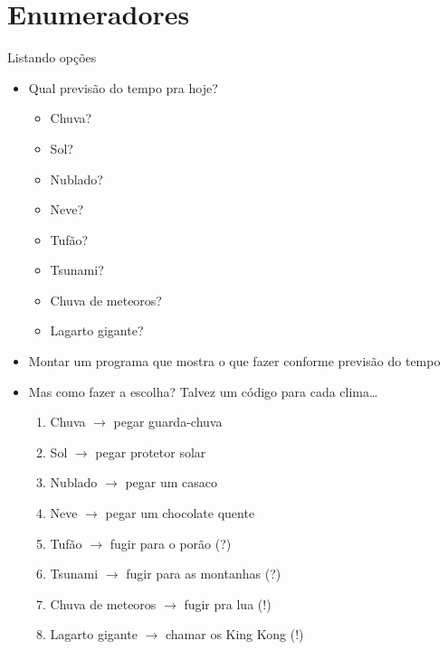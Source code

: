 \documentclass[14pt]{beamer}
\subtitle{O primeiro tipo do bebê}
\begin{document}
	
	\begin{frame}
		\titlepage
	\end{frame}

	\begin{frame}
		\tableofcontents
	\end{frame}

	\section{Enumeradores}
		\begin{frame}{Listando opções}
			\begin{itemize}
				\presentationPause\item Qual previsão do tempo pra hoje?
				\begin{itemize}
					\presentationPause\item Chuva?
					\presentationPause\item Sol?
					\presentationPause\item Nublado?
					\presentationPause\item Neve?
					\presentationPause\item Tufão?
					\presentationPause\item Tsunami?
					\presentationPause\item Chuva \presentationPause de meteoros?
					\presentationPause\item Lagarto gigante?
				\end{itemize}
				\presentationPause\item Montar um programa que mostra o que fazer conforme previsão do tempo
				\presentationPause\item Mas como fazer a escolha? \presentationPause Talvez um código para cada clima\dots
				\begin{enumerate}
					\presentationPause\item Chuva \presentationPause$\rightarrow$ pegar guarda-chuva
					\presentationPause\item Sol \presentationPause$\rightarrow$ pegar protetor solar
					\presentationPause\item Nublado \presentationPause$\rightarrow$ pegar um casaco
					\presentationPause\item Neve \presentationPause$\rightarrow$ pegar um chocolate quente
					\presentationPause\item Tufão \presentationPause$\rightarrow$ fugir para o porão \presentationPause(?)
					\presentationPause\item Tsunami \presentationPause$\rightarrow$ fugir para as montanhas \presentationPause(?)
					\presentationPause\item Chuva de meteoros \presentationPause$\rightarrow$ fugir pra lua (!)
					\presentationPause\item Lagarto gigante \presentationPause$\rightarrow$ chamar os King Kong (!)
				\end{enumerate}
			\end{itemize}
		\end{frame}
\end{document}

